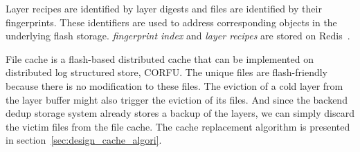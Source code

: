 Layer recipes are identified by layer digests and files are identified by their fingerprints.
These identifiers are used to address corresponding objects in the underlying flash storage. 
\emph{fingerprint index} and \emph{layer recipes}  are stored on Redis~\cite{redis}.

File cache is a flash-based distributed cache that can be implemented on distributed log structured store, \eg CORFU.
The unique files are flash-friendly because there is no modification to these files.
%
%
The eviction of a cold layer from the layer buffer might also trigger the eviction of its files.
And since the backend dedup storage system already stores a backup of the layers, 
we can simply discard the victim files from the file cache.
The cache replacement algorithm is presented in section~\cref{sec:design_cache_algori}. 

